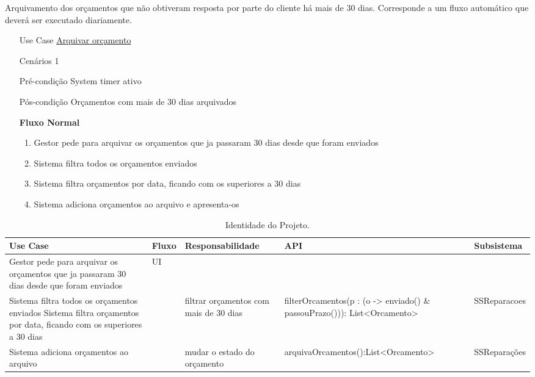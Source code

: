 \documentclass[../relatorio.tex]{subfiles}
\begin{document}
Arquivamento dos orçamentos que não obtiveram resposta por parte do cliente há mais de 30 dias.
Corresponde a um fluxo automático que deverá ser executado diariamente.
\begin{itemize}
    \item[Use Case] {\underline{Arquivar orçamento}}
    \item[Cenários] {1}
    \item[Pré-condição] {System timer ativo}
    \item[Pós-condição] {Orçamentos com mais de 30 dias arquivados}
          \begin{flushleft}
              \textbf{Fluxo Normal}
          \end{flushleft}
          \begin{enumerate}
              \item Gestor pede para arquivar os orçamentos que ja passaram 30 dias desde que foram enviados
              \item Sistema filtra todos os orçamentos enviados
              \item Sistema filtra orçamentos por data, ficando com os superiores a 30 dias
              \item Sistema adiciona orçamentos ao arquivo e apresenta-os
          \end{enumerate}
\end{itemize}


\begin{landscape}
    \begin{table}[!h]
        \centering
        \begin{tabular}{|p{5cm}|p{1cm}|p{4cm}|p{6cm}|p{3cm}|}
            \hline
            \rowcolor{gray!20!white}
            Use Case & Fluxo    & Responsabilidade & API & Subsistema    \\
            \hline
            \rowcolor{yellow}
            Gestor pede para arquivar os orçamentos que ja passaram 30 dias desde que foram enviados
                    & UI 
                    &                                        
                    &                                                          
                    &               
            \\
            \hline
            Sistema filtra todos os orçamentos enviados
            Sistema filtra orçamentos por data, ficando com os superiores a 30 dias
                    &          
                    & filtrar orçamentos com mais de 30 dias 
                    & filterOrcamentos(p : (o -> enviado() \& passouPrazo())): List<Orcamento> 
                    & SSReparacoes 
            \\
            \hline
            Sistema adiciona orçamentos ao arquivo                                  
                    &          
                    & mudar o estado do orçamento    
                    & arquivaOrcamentos():List<Orcamento>                    
                    & SSReparações 
            \\
            \hline
        \end{tabular}
        \caption{Identidade do Projeto.}
    \end{table}
\end{landscape}
\end{document}
